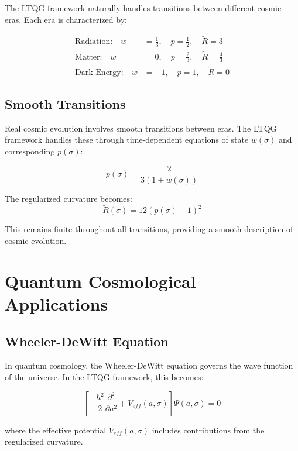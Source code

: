 \documentclass[11pt,a4paper]{article}
\begin{document}
The LTQG framework naturally handles transitions between different cosmic eras. Each era is characterized by:

\begin{align}
\text{Radiation:} \quad w &= \frac{1}{3}, \quad p = \frac{1}{2}, \quad \tilde{R} = 3 \\
\text{Matter:} \quad w &= 0, \quad p = \frac{2}{3}, \quad \tilde{R} = \frac{4}{3} \\
\text{Dark Energy:} \quad w &= -1, \quad p = 1, \quad \tilde{R} = 0
\end{align}

\subsection{Smooth Transitions}

Real cosmic evolution involves smooth transitions between eras. The LTQG framework handles these through time-dependent equations of state $w(\sigma)$ and corresponding $p(\sigma)$:

\begin{equation}
p(\sigma) = \frac{2}{3(1 + w(\sigma))}
\end{equation}

The regularized curvature becomes:
\begin{equation}
\tilde{R}(\sigma) = 12(p(\sigma) - 1)^2
\end{equation}

This remains finite throughout all transitions, providing a smooth description of cosmic evolution.

\section{Quantum Cosmological Applications}

\subsection{Wheeler-DeWitt Equation}

In quantum cosmology, the Wheeler-DeWitt equation governs the wave function of the universe. In the LTQG framework, this becomes:

\begin{equation}
\left[-\frac{\hbar^2}{2} \frac{\partial^2}{\partial a^2} + V_{eff}(a, \sigma)\right] \Psi(a, \sigma) = 0
\end{equation}

where the effective potential $V_{eff}(a, \sigma)$ includes contributions from the regularized curvature.
\end{document}
